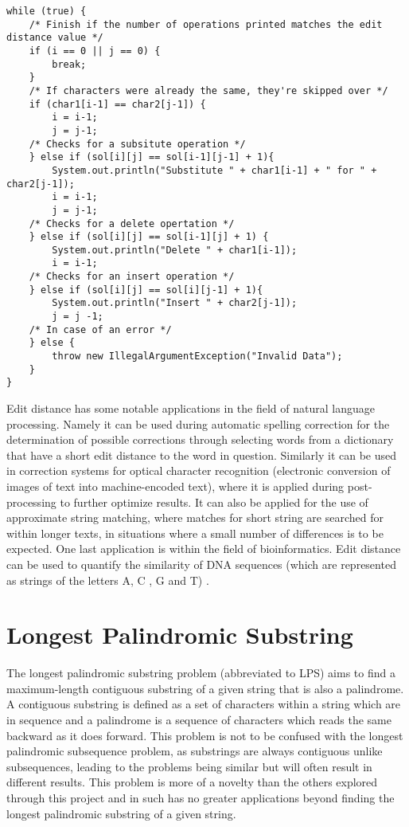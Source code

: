 \begin{lstlisting}
while (true) {
	/* Finish if the number of operations printed matches the edit distance value */
	if (i == 0 || j == 0) {
		break;
	}
	/* If characters were already the same, they're skipped over */
	if (char1[i-1] == char2[j-1]) {
		i = i-1;
		j = j-1;
	/* Checks for a subsitute operation */
	} else if (sol[i][j] == sol[i-1][j-1] + 1){
		System.out.println("Substitute " + char1[i-1] + " for " + char2[j-1]);
		i = i-1;
		j = j-1;
	/* Checks for a delete opertation */
	} else if (sol[i][j] == sol[i-1][j] + 1) {
		System.out.println("Delete " + char1[i-1]);
		i = i-1;
	/* Checks for an insert operation */
	} else if (sol[i][j] == sol[i][j-1] + 1){
		System.out.println("Insert " + char2[j-1]);
		j = j -1;
	/* In case of an error */
	} else {
		throw new IllegalArgumentException("Invalid Data");
	}
}
\end{lstlisting}

Edit distance has some notable applications in the field of natural language processing. Namely it can be used during automatic spelling correction for the determination of possible corrections through selecting words from a dictionary that have a short edit distance to the word in question. Similarly it can be used in correction systems for optical character recognition (electronic conversion of images of text into machine-encoded text), where it is applied during post-processing to further optimize results.  It can also be applied for the use of approximate string matching, where matches for short string are searched for within longer texts, in situations where a small number of differences is to be expected. One last application is within the field of bioinformatics. Edit distance can be used to quantify the similarity of DNA sequences (which are represented as strings of the letters A, C , G and T) \cite{bio_ED}.





\section{Longest Palindromic Substring}

The longest palindromic substring problem (abbreviated to LPS) aims to find a maximum-length contiguous substring of a given string that is also a palindrome. A contiguous substring is defined as a set of characters within a string which are in sequence and a palindrome is a sequence of characters which reads the same backward as it does forward. This problem is not to be confused with the longest palindromic subsequence problem, as substrings are always contiguous unlike subsequences, leading to the problems being similar but will often result in different results. This problem is more of a novelty than the others explored through this project and in such has no greater applications beyond finding the longest palindromic substring of a given string.

